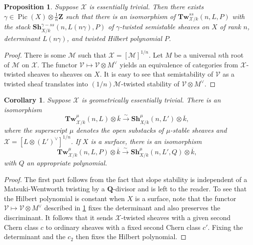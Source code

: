 \documentclass[11pt]{amsart}
\newcommand{\field}[1]{\mathbf #1}
\newcommand{\ms}[1]{\mathscr #1}
\newcommand{\widebar}[1]{\overline{#1}}
\newcommand{\Z}{\field Z}
\newcommand{\Q}{\field Q}
\newcommand{\simto}{\stackrel{\sim}{\to}}
\DeclareMathOperator{\Pic}{Pic}
\renewcommand{\[}{[\!\hspace{0.03em}[}
\renewcommand{\]}{]\!\hspace{0.03em}]}
\renewcommand{\(}{(\!\hspace{0.03em}(}
\renewcommand{\)}{)\!\hspace{0.03em})}
\DeclareMathOperator*{\tensor}{\otimes}
\newcommand{\Tw}{\mathbf{Tw}}
\newcommand{\Sh}{\mathbf{Sh}}
\newtheorem{prop}[lem]{Proposition}
\newtheorem{cor}[lem]{Corollary}
\theoremstyle{definition}
\theoremstyle{remark}
\begin{document}
\begin{prop}\label{P:essentially trivial no problem} Suppose $\ms X$ is essentially trivial.  Then there 
exists $\gamma\in\Pic(X)\tensor\frac{1}{n}\Z$ such that there is an 
isomorphism of $\Tw^{ss}_{\ms X/k}(n,L,P)$ with the stack 
$\Sh^{\gamma-ss}_{X/k}(n,L(n\gamma),P)$ of 
$\gamma$-twisted semistable sheaves on $X$ of rank $n$, determinant $L(n\gamma)$, and 
twisted Hilbert polynomial $P$.
\end{prop}
\begin{proof} There is some $\ms M$ such that $\ms X=[\ms M]^{1/n}$.  
Let $M$ be a universal $n$th root of $\ms M$ on $\ms X$.  The 
functor $\ms V\mapsto\ms V\tensor M^{\vee}$ yields an equivalence of 
categories from $\ms X$-twisted sheaves to sheaves on $X$.  It is easy to see that 
semistability of $\ms V$ as a twisted sheaf translates into $(1/n)\ms M$-twisted 
stability of $\ms V\tensor M^{\vee}$. 
\end{proof}

\begin{cor}\label{C:essentially trivial} Suppose $\ms X$ is geometrically essentially trivial. 
There is an isomorphism $$\Tw^{\mu}_{\ms X/k}(n,L)\tensor\widebar 
k\simto\Sh^{\mu}_{X/k}(n,L')\tensor\widebar 
k,$$ where the superscript $\mu$ denotes the open substacks of 
$\mu$-stable sheaves and $\ms X=[L\tensor (L')^{\vee}]^{1/n}$.  If $X$ 
is a surface, there is an isomorphism $$\Tw^{\mu}_{\ms X/k}(n,L,P)\tensor\widebar 
k\simto\Sh^{\mu}_{X/k}(n,L',Q)\tensor\widebar 
k,$$ with $Q$ an appropriate polynomial.
\end{cor}
\begin{proof} The first part follows from the fact that slope 
stability is independent of a Matsuki-Wentworth twisting by a 
$\Q$-divisor and is left to the reader.  To see that the Hilbert 
polynomial is constant when $X$ is a surface, note that the functor 
$\ms V\mapsto\ms V\tensor M^{\vee}$ described in \ref{P:essentially trivial no problem} fixes the 
determinant and also preserves the discriminant.  It follows that it 
sends $\ms X$-twisted sheaves with a given second Chern class $c$ to ordinary sheaves 
with a fixed second Chern class $c'$.  Fixing the determinant and 
the $c_{2}$ then fixes the Hilbert polynomial.
\end{proof}
\end{document}
